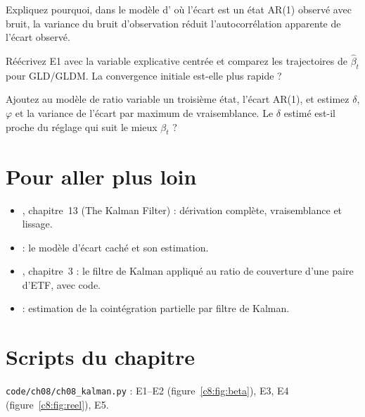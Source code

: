 \begin{exercise}
Expliquez pourquoi, dans le modèle d'\citet{elliott2005} où l'écart est un état AR(1) observé avec bruit, la variance du bruit d'observation réduit l'autocorrélation apparente de l'écart observé.
\end{exercise}

\begin{exercise}[à coder]
Réécrivez E1 avec la variable explicative centrée et comparez les trajectoires de $\hat\beta_t$ pour GLD/GLDM. La convergence initiale est-elle plus rapide ?
\end{exercise}

\begin{exercise}[à coder]
Ajoutez au modèle de ratio variable un troisième état, l'écart AR(1), et estimez $\delta$, $\varphi$ et la variance de l'écart par maximum de vraisemblance. Le $\delta$ estimé est-il proche du réglage qui suit le mieux $\beta_t$ ?
\end{exercise}

\section{Pour aller plus loin}

\begin{toread}
\begin{itemize}[leftmargin=1.2em]
\item \citet{hamilton1994}, chapitre~13 (\og The Kalman Filter\fg) : dérivation complète, vraisemblance et lissage.
\item \citet{elliott2005} : le modèle d'écart caché et son estimation.
\item \citet{chan2013}, chapitre~3 : le filtre de Kalman appliqué au ratio de couverture d'une paire d'ETF, avec code.
\item \citet{clegg2018} : estimation de la cointégration partielle par filtre de Kalman.
\end{itemize}
\end{toread}

\section{Scripts du chapitre}
\noindent\texttt{code/ch08/ch08\_kalman.py} : E1–E2 (figure~\ref{c8:fig:beta}), E3, E4 (figure~\ref{c8:fig:reel}), E5.
